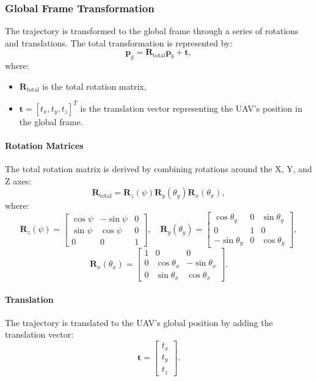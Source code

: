 \subsubsection{ Global Frame Transformation}
The trajectory is transformed to the global frame through a series of rotations and translations. The total transformation is represented by:
\[
\mathbf{p}_g = \mathbf{R}_\text{total} \mathbf{p}_b + \mathbf{t},
\]
where:
\begin{itemize}
    \item \(\mathbf{R}_\text{total}\) is the total rotation matrix,
    \item \(\mathbf{t} = [t_x, t_y, t_z]^T\) is the translation vector representing the UAV's position in the global frame.
\end{itemize}

\paragraph{ Rotation Matrices}
The total rotation matrix is derived by combining rotations around the X, Y, and Z axes:
\[
\mathbf{R}_\text{total} = \mathbf{R}_z(\psi) \mathbf{R}_y(\theta_y) \mathbf{R}_x(\theta_x),
\]
where:
\[
\mathbf{R}_z(\psi) =
\begin{bmatrix}
    \cos\psi & -\sin\psi & 0 \\
    \sin\psi & \cos\psi & 0 \\
    0 & 0 & 1
\end{bmatrix}, \quad
\mathbf{R}_y(\theta_y) =
\begin{bmatrix}
    \cos\theta_y & 0 & \sin\theta_y \\
    0 & 1 & 0 \\
    -\sin\theta_y & 0 & \cos\theta_y
\end{bmatrix},
\]
\[
\mathbf{R}_x(\theta_x) =
\begin{bmatrix}
    1 & 0 & 0 \\
    0 & \cos\theta_x & -\sin\theta_x \\
    0 & \sin\theta_x & \cos\theta_x
\end{bmatrix}.
\]

\paragraph{ Translation}
The trajectory is translated to the UAV's global position by adding the translation vector:
\[
\mathbf{t} = 
\begin{bmatrix}
    t_x \\
    t_y \\
    t_z
\end{bmatrix}.
\]

